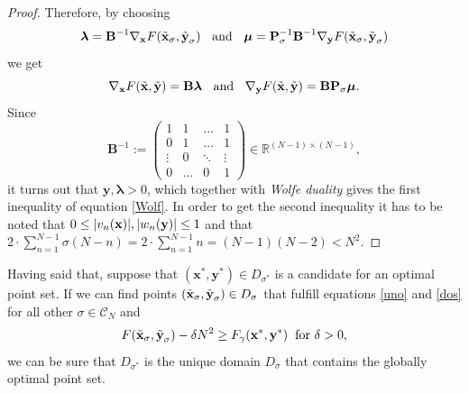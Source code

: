 \begin{proof}
Therefore, by choosing
\begin{equation*}
    \bm{\lambda} = \textbf{B}^{-1} \nabla_{\textbf{x}}F(\Tilde{\textbf{x}}_{\sigma},\Tilde{\textbf{y}}_{\sigma}) \hspace{2mm} \text{ and } \hspace{2mm} \bm{\mu} = \textbf{P}_{\sigma}^{-1} \textbf{B}^{-1} \nabla_{\textbf{y}}F(\Tilde{\textbf{x}}_{\sigma},\Tilde{\textbf{y}}_{\sigma})
\end{equation*}
we get
\begin{equation*}
    \nabla_{\textbf{x}}F(\Tilde{\textbf{x}},\Tilde{\textbf{y}}) = \textbf{B} \bm{\lambda} \hspace{2mm} \text{ and } \hspace{2mm} \nabla_{\textbf{y}}F(\Tilde{\textbf{x}},\Tilde{\textbf{y}}) = \textbf{B}\textbf{P}_{\sigma}\bm{\mu}.
\end{equation*}
Since 
\begin{equation*}
    \textbf{B}^{-1} := 
    \begin{pmatrix}
        1&1&...&1\\
        0&1&...&1\\
        \vdots&0&\ddots&\vdots\\
        0&...&0&1
    \end{pmatrix} \in \mathbb{R}^{(N-1)\times(N-1)},
\end{equation*}
it turns out that $\textbf{y},\bm{\lambda} > 0$, which together with \textit{Wolfe duality} gives the first inequality of equation \eqref{Wolf}. In order to get the second inequality it has to be noted that $0 \leq \lvert v_n(\textbf{x})\rvert,\lvert w_n(\textbf{y})\rvert \leq 1$ and that $2\cdot \sum_{n=1}^{N-1} \sigma(N-n) = 2 \cdot \sum_{n=1}^{N-1} n = (N-1)(N-2) < N^2$.
\end{proof}
\vspace{2mm}

Having said that, suppose that $(\textbf{x}^*,\textbf{y}^*)\in D_{\sigma^*}$ is a candidate for an optimal point set. If we can find points $(\Tilde{\textbf{x}}_{\sigma},\Tilde{\textbf{y}}_{\sigma}) \in D_{\sigma}$ that fulfill equations \eqref{uno} and \eqref{dos} for all other $\sigma \in \mathcal{C}_N$ and
\begin{equation*}
    F(\Tilde{\textbf{x}}_{\sigma},\Tilde{\textbf{y}}_{\sigma}) - \delta N^2 \geq F_{\gamma}(\textbf{x}^*,\textbf{y}^*) \hspace{2mm} \text{for } \delta > 0,
\end{equation*}
we can be sure that $D_{\sigma^*}$ is the unique domain $D_{\sigma}$ that contains the globally optimal point set.\\

